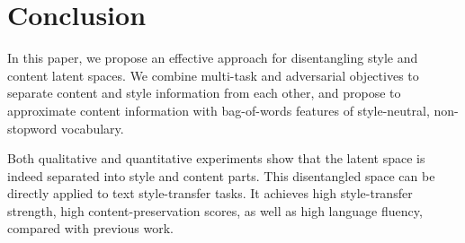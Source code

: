 \documentclass[11pt,a4paper]{article}
\begin{document}
\section{Conclusion}
In this paper, we propose an effective approach for disentangling style and content latent spaces.
We combine multi-task and adversarial objectives to separate content and style information from each other, and propose to approximate content information with bag-of-words features of style-neutral, non-stopword vocabulary.

Both qualitative and quantitative experiments show that the latent space is indeed separated into style and content parts.
This disentangled space can be directly applied to text style-transfer tasks.
It achieves high style-transfer strength, high content-preservation scores, as well as high language fluency, compared with previous work.



\end{document}
